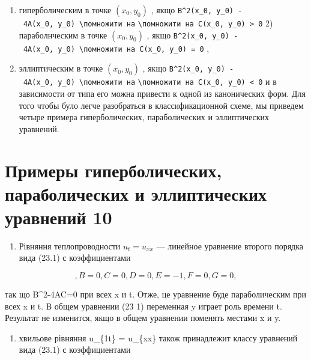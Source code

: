 \documentclass[
  ukrainian,
]{article}
\providecommand{\tightlist}{%
  \setlength{\itemsep}{0pt}\setlength{\parskip}{0pt}}
\begin{document}
\begin{enumerate}
\def\labelenumi{\arabic{enumi})}
\item
  гиперболическим в точке \((x_0, y_0)\) , якщо
  \texttt{B\^{}2(x\_0,\ y\_0)\ -\ 4A(x\_0,\ y\_0)\ \textbackslash{}помножити\ на}
  \texttt{\textbackslash{}помножити\ на\ C(x\_0,\ y\_0)\ \textgreater{}\ 0}
  2) параболнческим в точке \((x_0, y_0)\) , якщо
  \texttt{B\^{}2(x\_0,\ y\_0)\ -\ 4A(x\_0,\ y\_0)\ \textbackslash{}помножити\ на\ C(x\_0,\ y\_0)\ =\ 0}
  ,
\item
  эллиптическим в точке \((x_0, y_0)\) , якщо
  \texttt{B\^{}2(x\_0,\ y\_0)\ -\ 4A(x\_0,\ y\_0)\ \textbackslash{}помножити\ на}
  \texttt{\textbackslash{}помножити\ на\ C(x\_0,\ y\_0)\ \textless{}\ 0}
  и в зависимости от типа его можна привести к одной из канонических
  форм. Для того чтобы було легче разобраться в классификационной схеме,
  мы приведем четыре примера гиперболических, параболических и
  эллиптических уравнений.
\end{enumerate}

\section{Примеры гиперболических, параболических и эллиптических
уравнений
10}\label{ux43fux440ux438ux43cux435ux440ux44b-ux433ux438ux43fux435ux440ux431ux43eux43bux438ux447ux435ux441ux43aux438ux445-ux43fux430ux440ux430ux431ux43eux43bux438ux447ux435ux441ux43aux438ux445-ux438-ux44dux43bux43bux438ux43fux442ux438ux447ux435ux441ux43aux438ux445-ux443ux440ux430ux432ux43dux435ux43dux438ux439-10}

\begin{enumerate}
\def\labelenumi{\arabic{enumi}.}
\tightlist
\item
  Рівняння теплопроводности \(u_t = u_{xx}\) --- линейное уравнение
  второго порядка вида (23.1) с коэффициентами
\end{enumerate}

\[
,  B=0  ,  C=0  ,  D=0  ,  E=-1  ,  F=0  ,  G=0  ,
\]

так що B\^{}2-4AC=0 при всех x и t. Отже, це уравнение буде
параболическим при всех x и t. В общем уравнении (23 1) переменная y
играет роль времени t. Результат не изменится, якщо в общем уравнении
поменять местами x и y.

\begin{enumerate}
\def\labelenumi{\arabic{enumi}.}
\setcounter{enumi}{1}
\tightlist
\item
  хвильове рівняння u\_\{1t\} = u\_\{xx\} також принадлежит классу
  уравнений вида (23.1) с коэффициентами
\end{enumerate}
\end{document}
